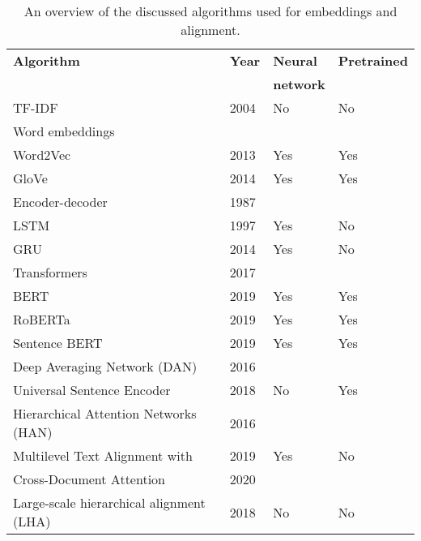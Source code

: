 \begin{table}[h!tbp]
    \centering
    \captionsetup{justification=centering}
    \begin{tabular}{p{7.5cm}|l|l|l}
    	\textbf{Algorithm} & \textbf{Year} & \textbf{Neural} & \textbf{Pretrained} \\ 
    	& & \textbf{network}\\
		\hline
        TF-IDF & 2004  & No & No   \\
		\hline
        Word embeddings & &  \\
		\hline
        \hspace{3mm}Word2Vec & 2013 & Yes & Yes \\ 
		\hline
        \hspace{3mm}GloVe & 2014 & Yes & Yes \\ 
		\hline
        Encoder-decoder & 1987 & \\
		\hline
        \hspace{3mm}LSTM & 1997 & Yes & No   \\ 
		\hline
        \hspace{3mm}GRU & 2014 & Yes & No \\
		\hline
        Transformers & 2017 & & \\
		\hline
        \hspace{3mm}BERT & 2019 & Yes & Yes  \\
		\hline
        \hspace{3mm}RoBERTa & 2019 & Yes & Yes  \\ 
		\hline
        \hspace{3mm}Sentence BERT & 2019 & Yes & Yes   \\ 
		\hline
        Deep Averaging Network (DAN) & 2016 & \\ 
		\hline
        \hspace{3mm}Universal Sentence Encoder & 2018 & No &  Yes \\
        Hierarchical Attention Networks (HAN) & 2016 & \\ 
		\hline
        \hspace{3mm}Multilevel Text Alignment with & 2019 & Yes &  No \\
        \hspace{3mm}Cross-Document Attention & 2020 & & \\ 
		\hline
        \hspace{3mm}Large-scale hierarchical alignment (LHA) & 2018 & No & No  \\ 
		\hline
    \end{tabular}
    \caption{An overview of the discussed algorithms used for embeddings and alignment.}
  	\label{tabAlgorithms}
\end{table}




